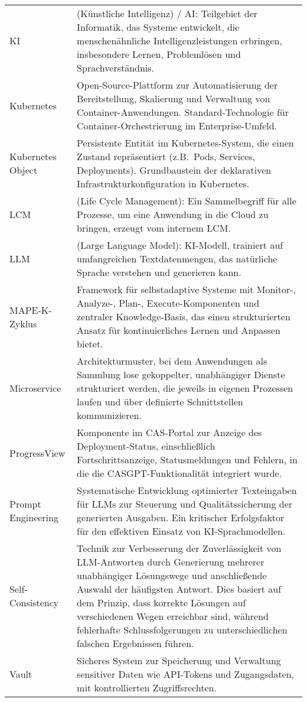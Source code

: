\begin{tabularx}{\textwidth}{lX}
KI & (Künstliche Intelligenz) / AI: Teilgebiet der Informatik, das Systeme entwickelt, die menschenähnliche Intelligenzleistungen erbringen, insbesondere Lernen, Problemlösen und Sprachverständnis.\\

Kubernetes & Open-Source-Plattform zur Automatisierung der Bereitstellung, Skalierung und Verwaltung von Container-Anwendungen. Standard-Technologie für Container-Orchestrierung im Enterprise-Umfeld.\\

Kubernetes Object & Persistente Entität im Kubernetes-System, die einen Zustand repräsentiert (z.B.\ Pods, Services, Deployments). Grundbaustein der deklarativen Infrastrukturkonfiguration in Kubernetes.\\

LCM & (Life Cycle Management): Ein Sammelbegriff für alle Prozesse, um eine Anwendung in die Cloud zu bringen, erzeugt vom internem LCM.\\

LLM & (Large Language Model): KI-Modell, trainiert auf umfangreichen Textdatenmengen, das natürliche Sprache verstehen und generieren kann.\\

MAPE-K-Zyklus & Framework für selbstadaptive Systeme mit Monitor-, Analyze-, Plan-, Execute-Komponenten und zentraler Knowledge-Basis, das einen strukturierten Ansatz für kontinuierliches Lernen und Anpassen bietet.\\

Microservice & Architekturmuster, bei dem Anwendungen als Sammlung lose gekoppelter, unabhängiger Dienste strukturiert werden, die jeweils in eigenen Prozessen laufen und über definierte Schnittstellen kommunizieren.\\

ProgressView & Komponente im CAS-Portal zur Anzeige des Deployment-Status, einschließlich Fortschrittsanzeige, Statusmeldungen und Fehlern, in die die CASGPT-Funktionalität integriert wurde.\\

Prompt Engineering & Systematische Entwicklung optimierter Texteingaben für LLMs zur Steuerung und Qualitätssicherung der generierten Ausgaben. Ein kritischer Erfolgsfaktor für den effektiven Einsatz von KI-Sprachmodellen.\\

Self-Consistency & Technik zur Verbesserung der Zuverlässigkeit von LLM-Antworten durch Generierung mehrerer unabhängiger Lösungswege und anschließende Auswahl der häufigsten Antwort. Dies basiert auf dem Prinzip, dass korrekte Lösungen auf verschiedenen Wegen erreichbar sind, während fehlerhafte Schlussfolgerungen zu unterschiedlichen falschen Ergebnissen führen.\\

Vault & Sicheres System zur Speicherung und Verwaltung sensitiver Daten wie API-Tokens und Zugangsdaten, mit kontrollierten Zugriffsrechten.\\

\end{tabularx}
\endgroup
\newpage
\fancyhead[L]{\slshape\nouppercase\leftmark}